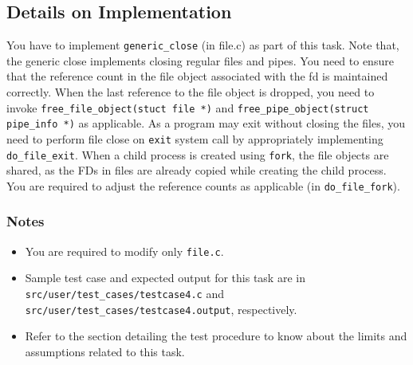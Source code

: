 \documentclass[12pt]{article}
\begin{document}
\subsection*{Details on Implementation}
%
You have to implement {\tt generic\_close} (in file.c) as part of this task.  Note that,
the generic close implements closing regular files and pipes.
You need to ensure that the reference count in the file object associated with the fd 
is maintained correctly. When the last reference to the file object is dropped, you need to invoke
{\tt free\_file\_object(stuct file *)} and {\tt free\_pipe\_object(struct pipe\_info *)} as 
applicable.
%
As a program may exit without closing the files, you need to perform file close on
{\tt exit} system call by appropriately implementing {\tt do\_file\_exit}.
%
When a child process is created using {\tt fork}, the file objects are shared, as the FDs in files
are already copied while creating the child process. You are required to adjust the
reference counts as applicable (in {\tt  do\_file\_fork}).

\subsubsection*{Notes}

\begin{itemize}
    \item You are required to modify only {\tt file.c}.
    \item Sample test case and expected output for this task are in {\tt src/user/test\_cases/testcase4.c}
        and {\tt src/user/test\_cases/testcase4.output}, respectively.
    \item Refer to the section detailing the test procedure to know about the limits and assumptions related to
          this task.
\end{itemize}
\end{document}
